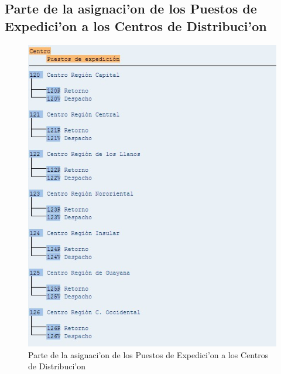 \subsection*{Parte de la asignaci'on de los Puestos de Expedici'on a los Centros de Distribuci'on}
\begin{figure}[htb]
\centering
\includegraphics[scale=0.65,type=jpg,ext=.jpg,read=.jpg]{figures/ExpedicionCentro}
\caption{Parte de la asignaci'on de los Puestos de Expedici'on a los Centros de Distribuci'on}
\label{fig:asigna6}
\end{figure}

